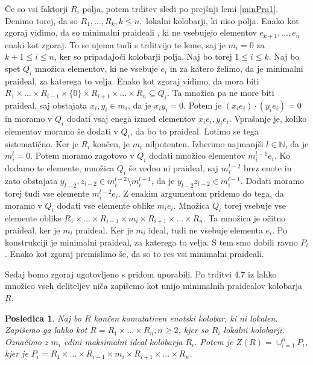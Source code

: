 \documentclass[a4paper, 12pt]{amsart}
\theoremstyle{definition} %
\theoremstyle{plain} %
\newtheorem{posledica}[definicija]{Posledica}
\newcommand{\N}{\mathbb N}
\begin{document}
\proof
Če so vsi faktorji $R_i$ polja, potem trditev sledi po prejšnji lemi \ref{minPra1}. Denimo torej, da so $R_1, \dots,R_k, k\le n,$ lokalni kolobarji, ki niso polja. Enako kot zgoraj vidimo, da so minimalni praideali , ki ne vsebujejo elementov $e_{k+1}, \dots, e_n$ enaki kot zgoraj. To se ujema tudi s trditvijo te leme, saj je $m_i = 0$ za $k+1 \le i \le n$, ker so pripadajoči kolobarji polja. 
Naj bo torej $1 \le i \le k$. Naj bo spet $Q_i$ množica elementov, ki ne vsebuje $e_i$ in za katero želimo, da je minimalni praideal, za katerega to velja. Enako kot zgoraj vidimo, da mora biti $R_1 \times \dots \times R_{i-1} \times \{0\} \times R_{i+1} \times \dots \times R_n \subseteq Q_i$. Ta množica pa ne more biti praideal, saj obstajata $x_i,y_i\in m_i$, da je $x_i y_i = 0$. Potem je $(x_i e_i ) \cdot (y_i e_i) = 0$ in moramo v $Q_i$ dodati vsaj enega izmed elementov $x_i e_i, y_i e_i$. Vprašanje je, koliko elementov moramo še dodati v $Q_i$, da bo to praideal. Lotimo se tega sistematično. Ker je $R_i$ končen, je $m_i$ nilpotenten. Izberimo najmanjši $l\in  \N$, da je $m_i^l = 0$. Potem moramo zagotovo v $Q_i$ dodati množico elementov $m_i^{l-1} e_i$. Ko dodamo te elemente, množica $Q_i$ še vedno ni praideal, saj $m_i^{l-2}$ brez enote in zato obstajata $y_{l-2},z_{l-2}\in m_i^{l-2} \setminus m_i^{l-1}$, da je $y_{l-2}z_{l-2} \in m_i^{l-1}$. Dodati moramo torej tudi vse elemente $m_i^{l-2}e_i$. Z enakim argumentom pridemo do tega, da moramo v $Q_i$ dodati vse elemente oblike $m_i e_i$. Množica $Q_i$ torej vsebuje vse elemente oblike $R_1 \times \dots \times R_{i-1} \times m_i \times R_{i+1} \times \dots \times R_n$. Ta množica je očitno praideal, ker je $m_i$ praideal. Ker je $m_i$ ideal, tudi ne vsebuje elementa $e_i$. Po konstrukciji je minimalni praideal, za katerega to velja. S tem smo dobili ravno $P_i$.
Enako kot zgoraj premislimo še, da so to res vsi minimalni praideali.
\endproof

Sedaj bomo zgoraj ugotovljeno s pridom uporabili. Po trditvi 4.7 iz \cite{Atiyah} lahko množico vseh deliteljev niča zapišemo kot unijo minimalnih  praidealov kolobarja $R$.

\begin{posledica}
\label{deliteljiNicaUnijaMinPra}
Naj bo $R$ končen komutativen enotski kolobar, ki ni lokalen. Zapišemo ga lahko kot $R = R_1 \times \dots \times R_n, n\ge2$, kjer so $R_i$ lokalni kolobarji. Označimo z $m_i$ edini maksimalni ideal kolobarja $R_i$. Potem je $Z(R) = \cup_{i=1}^n P_i$, kjer je $P_i = R_1 \times \dots \times R_{i-1} \times m_i \times R_{i+1} \times \dots \times R_n$.
\end{posledica}
\end{document}
